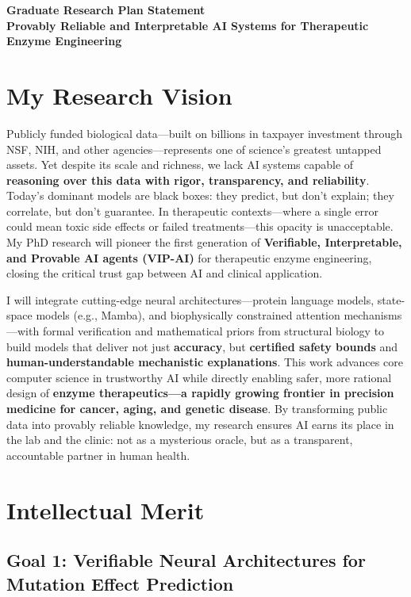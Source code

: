 \documentclass[11pt]{article}
\begin{document}
\begin{center}
\textbf{\large Graduate Research Plan Statement}\\
\textbf{Provably Reliable and Interpretable AI Systems for Therapeutic Enzyme Engineering}
\end{center}

\section*{My Research Vision} 

Publicly funded biological data—built on billions in taxpayer investment through
NSF, NIH, and other agencies—represents one of science’s greatest untapped
assets. Yet despite its scale and richness, we lack AI systems capable of {\bf
reasoning over this data with rigor, transparency, and reliability}. Today’s
dominant models are black boxes: they predict, but don’t explain; they
correlate, but don’t guarantee. In therapeutic contexts—where a single error
could mean toxic side effects or failed treatments—this opacity is unacceptable.
My PhD research will pioneer the first generation of {\bf Verifiable,
Interpretable, and Provable AI agents (VIP-AI)} for therapeutic enzyme
engineering, closing the critical trust gap between AI and clinical application.

I will integrate cutting-edge neural architectures—protein language models,
state-space models (e.g., Mamba), and biophysically constrained attention
mechanisms—with formal verification and mathematical priors from structural
biology to build models that deliver not just {\bf accuracy}, but {\bf certified safety
bounds} and {\bf human-understandable mechanistic explanations}. This work advances
core computer science in trustworthy AI while directly enabling safer, more
rational design of {\bf enzyme therapeutics—a rapidly growing frontier in precision
medicine for cancer, aging, and genetic disease}. By transforming public data
into provably reliable knowledge, my research ensures AI earns its place in the
lab and the clinic: not as a mysterious oracle, but as a transparent,
accountable partner in human health.




\section*{Intellectual Merit}

\subsection*{Goal 1: Verifiable Neural Architectures for Mutation Effect Prediction}
\end{document}
